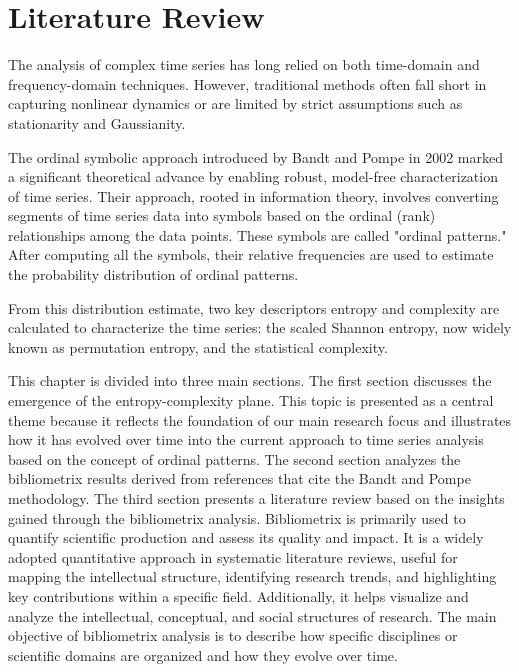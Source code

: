 \chapter{Literature Review}\label{C:lit}

The analysis of complex time series has long relied on both time-domain and frequency-domain techniques. 
However, traditional methods often fall short in capturing nonlinear dynamics or are limited by strict assumptions such as stationarity and Gaussianity. 

The ordinal symbolic approach introduced by Bandt and Pompe in 2002 marked a significant theoretical advance by enabling robust, model-free characterization of time series. 
Their approach, rooted in information theory, involves converting segments of time series data into symbols based on the ordinal (rank) relationships among the data points.
These symbols are called "ordinal patterns." After computing all the symbols, their relative frequencies are used to estimate the probability distribution of ordinal patterns.

From this distribution estimate, two key descriptors entropy and complexity are calculated to characterize the time series: the scaled Shannon entropy, now widely known as permutation entropy, and the statistical complexity.

This chapter is divided into three main sections. The first section discusses the emergence of the entropy-complexity plane. This topic is presented as a central theme because it reflects the foundation of our main research focus and illustrates how it has evolved over time into the current approach to time series analysis based on the concept of ordinal patterns.
The second section analyzes the bibliometrix results derived from references that cite the Bandt and Pompe methodology. The third section presents a literature review based on the insights gained through the bibliometrix analysis. Bibliometrix is primarily used to quantify scientific production and assess its quality and impact. It is a widely adopted quantitative approach in systematic literature reviews, useful for mapping the intellectual structure, identifying research trends, and highlighting key contributions within a specific field. Additionally, it helps visualize and analyze the intellectual, conceptual, and social structures of research. The main objective of bibliometrix analysis is to describe how specific disciplines or scientific domains are organized and how they evolve over time.

